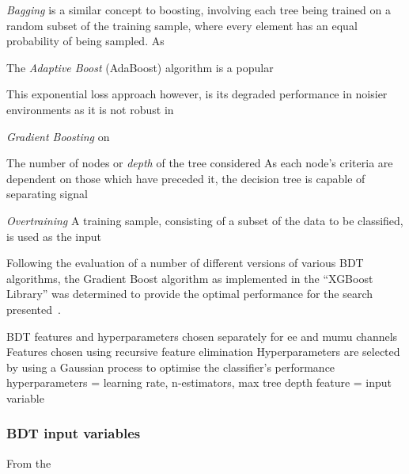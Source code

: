 \emph{Bagging} is a similar concept to boosting, involving each tree being trained on a random subset of the training sample, where every element has an equal probability of being sampled.
As 

The \emph{Adaptive Boost} (AdaBoost) algorithm is a popular 

This exponential loss approach however, is its degraded performance in noisier environments as it is not robust in 	


\emph{Gradient Boosting} on 

The number of nodes or \emph{depth} of the tree considered
As each node's criteria are dependent on those which have preceded it, the decision tree is capable of separating signal 

\emph{Overtraining}
A training sample, consisting of a subset of the data to be classified, is used as the input 


Following the evaluation of a number of different versions of various BDT algorithms, the Gradient Boost algorithm as implemented in the ``XGBoost Library'' was determined to provide the optimal performance for the search presented~\cite{xgboost}.



BDT features and hyperparameters chosen separately for ee and mumu channels
Features chosen using recursive feature elimination
Hyperparameters are selected by using a Gaussian process to optimise the classifier’s performance
hyperparameters = learning rate, n-estimators, max tree depth
feature = input variable

\subsubsection{BDT input variables}

From the 

